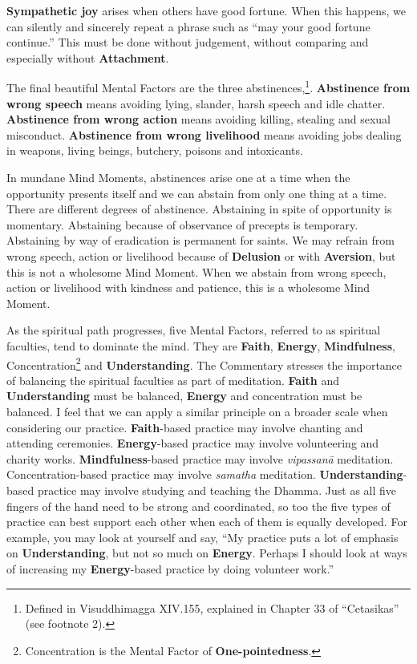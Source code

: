 \textbf{Sympathetic joy} arises when others have good fortune. When this happens, we can silently and sincerely repeat a phrase such as “may your good fortune continue.” This must be done without judgement, without comparing and especially without \textbf{Attachment}.

The final beautiful Mental Factors are the three abstinences,\footnote{Defined in Visuddhimagga XIV.155, explained in Chapter 33 of “Cetasikas” (see footnote 2).}. \textbf{Abstinence from wrong speech} means avoiding lying, slander, harsh speech and idle chatter. \textbf{Abstinence from wrong action} means avoiding killing, stealing and sexual misconduct. \textbf{Abstinence from wrong livelihood} means avoiding jobs dealing in weapons, living beings, butchery, poisons and intoxicants. 

In mundane Mind Moments, abstinences arise one at a time when the opportunity presents itself and we can abstain from only one thing at a time. There are different degrees of abstinence. Abstaining in spite of opportunity is momentary. Abstaining because of observance of precepts is temporary. Abstaining by way of eradication is permanent for saints. We may refrain from wrong speech, action or livelihood because of \textbf{Delusion} or with \textbf{Aversion}, but this is not a wholesome Mind Moment. When we abstain from wrong speech, action or livelihood with kindness and patience, this is a wholesome Mind Moment.

As the spiritual path progresses, five Mental Factors, referred to as spiritual faculties, tend to dominate the mind. They are \textbf{Faith}, \textbf{Energy}, \textbf{Mindfulness}, Concentration\footnote{Concentration is the Mental Factor of \textbf{One-pointedness}.} and \textbf{Understanding}. The Commentary stresses the importance of balancing the spiritual faculties as part of meditation. \textbf{Faith} and \textbf{Understanding} must be balanced, \textbf{Energy} and concentration must be balanced. I feel that we can apply a similar principle on a broader scale when considering our \color{blue} practice\color{black}. \textbf{Faith}-based \color{blue} practice\color{black} may involve chanting and attending ceremonies. \textbf{Energy}-based \color{blue} practice\color{black} may involve volunteering and charity works. \textbf{Mindfulness}-based \color{blue} practice\color{black} may involve \textit{vipassanā} meditation. Concentration-based \color{blue} practice\color{black} may involve \textit{samatha} meditation. \textbf{Understanding}-based \color{blue} practice\color{black} may involve studying and teaching the Dhamma. Just as all five fingers of the hand need to be strong and coordinated, so too the five types of \color{blue} practice\color{black} can best support each other when each of them is equally developed. For example, you may look at yourself and say, “My \color{blue} practice\color{black} puts a lot of emphasis on \textbf{Understanding}, but not so much on \textbf{Energy}. Perhaps I should look at ways of increasing my \textbf{Energy}-based \color{blue} practice\color{black} by doing volunteer work.”

